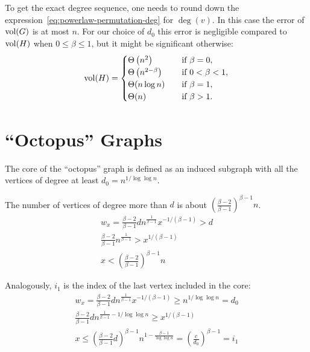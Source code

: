 To get the exact degree sequence, one needs to round down
the expression~\eqref{eq:powerlaw-permutation-deg} for $\deg(v)$.
In this case the error of $\operatorname*{vol}(G)$ is at most $n$.
For our choice of $d_0$ this error is negligible compared to $\operatorname*{vol}(H)$
when $0\leq\beta\leq1$, but it might be significant otherwise:
\begin{equation}
    \operatorname*{vol}(H)=
    \begin{cases}
        \Theta\left(n^2\right) & \quad \text{if } \beta=0,\\
        \Theta\left(n^{2-\beta}\right) & \quad \text{if } 0<\beta<1,\\
        \Theta(n \log n) & \quad \text{if } \beta=1,\\
        \Theta(n) & \quad \text{if } \beta>1.
    \end{cases}
\end{equation}

\section{\texorpdfstring{``Octopus''}{"Octopus"} Graphs}

The core of the ``octopus'' graph is defined as an induced subgraph
with all the vertices of degree at least $d_0=n^{1/\log\log n}$.



The number of vertices of degree more than $d$
is about $\left(\frac{\beta-2}{\beta-1}\right)^{\beta-1}n$.
\begin{gather*}
    w_x=\frac{\beta-2}{\beta-1}dn^{\frac{1}{\beta-1}}x^{-1/(\beta-1)}>d\\
    \frac{\beta-2}{\beta-1}n^{\frac{1}{\beta-1}}>x^{1/(\beta-1)}\\
    x<\left(\frac{\beta-2}{\beta-1}\right)^{\beta-1}n
\end{gather*}

Analogously, $i_1$ is the index of the last vertex included in the core:
\begin{gather*}
    w_x=\frac{\beta-2}{\beta-1}dn^{\frac{1}{\beta-1}}x^{-1/(\beta-1)}\geq n^{1/\log\log n}=d_0\\
    \frac{\beta-2}{\beta-1}dn^{\frac{1}{\beta-1}-1/\log\log n}\geq x^{1/(\beta-1)}\\
    x\leq\left(\frac{\beta-2}{\beta-1}d\right)^{\beta-1}n^{1-\frac{\beta-1}{\log\log n}}=\left(\frac{c}{d_0}\right)^{\beta-1}=i_1
\end{gather*}

